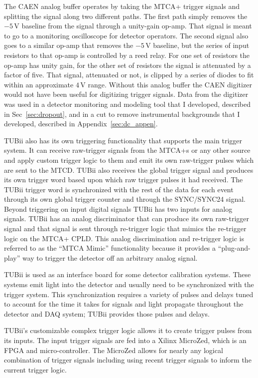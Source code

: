 The CAEN analog buffer operates
by taking the MTCA+ trigger signals and splitting
the signal along two different paths.
The first path simply removes the $-5$\,V baseline from the signal
through a unity-gain op-amp.
That signal is meant to go to a monitoring oscilloscope for detector
operators.
The second signal also goes to a similar op-amp that removes the
$-5$\,V baseline, but the series of input resistors to that op-amp
is controlled by a reed relay.
For one set of resistors the op-amp has unity gain, for the other set
of resistors the signal is attenuated by a factor of five.
That signal, attenuated or not, is clipped by a series of diodes to fit
within an approximate $4$\,V range.
Without this analog buffer the CAEN digitizer would not have been
useful for digitizing trigger signals.
Data from the digitizer was used in a detector monitoring and modeling
tool that I developed, described in Sec~\ref{sec:dropout}, and in
a cut to remove instrumental backgrounds that I developed, described in Appendix~\ref{sec:dc_appen}.

TUBii also has its own triggering functionality that supports the main
trigger system.
It can receive raw-trigger signals from the MTCA+s 
or any other source and
apply custom trigger logic to them and emit its own raw-trigger pulses which are
sent to the MTCD\@.
TUBii also receives the global trigger signal and produces its own trigger
word based upon which raw trigger pulses it had received. The TUBii trigger
word is synchronized with the rest of the data for each event through its own
global trigger counter and through the SYNC/SYNC24 signal.
Beyond triggering on input digital signals TUBii has two inputs for analog
signals.
TUBii has an analog discriminator that can produce its own raw-trigger signal
and that signal is sent through re-trigger logic that mimics the re-trigger
logic on the MTCA+ CPLD\@.
This analog discrimination and re-trigger logic is referred to as the ``MTCA
Mimic'' functionality because it provides a ``plug-and-play'' 
way to trigger the detector off an arbitrary analog signal.

TUBii is used as an interface board for some detector calibration systems.
These systems emit light into the detector and usually need to be
synchronized with the trigger system. This synchronization requires
a variety of pulses and delays tuned to account for the time it
takes for signals and light propagate throughout the detector and DAQ
system; TUBii provides those pulses and delays.

TUBii's customizable complex trigger logic
allows it to create trigger pulses from its inputs.
The input trigger signals are fed into a Xilinx MicroZed, which is an FPGA and
micro-controller.
The MicroZed allows for nearly any logical combination of trigger signals including
using recent trigger signals to inform the current trigger logic.

